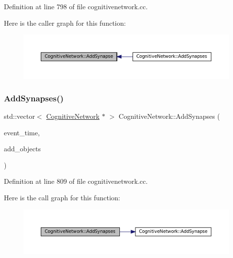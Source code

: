 Definition at line 798 of file cognitivenetwork.\+cc.

Here is the caller graph for this function\+:\nopagebreak
\begin{figure}[H]
\begin{center}
\leavevmode
\includegraphics[width=350pt]{class_cognitive_network_a4bfdcd2affdfe2adb2da68dba60dff0e_icgraph}
\end{center}
\end{figure}
\mbox{\label{class_cognitive_network_a09d9e01cbd8596af7fac626ce2753643}} 
\subsubsection{\texorpdfstring{Add\+Synapses()}{AddSynapses()}}
{\footnotesize\ttfamily std\+::vector$<$ \mbox{\hyperlink{class_cognitive_network}{Cognitive\+Network}} $\ast$ $>$ Cognitive\+Network\+::\+Add\+Synapses (\begin{DoxyParamCaption}\item[{std\+::chrono\+::time\+\_\+point$<$ \mbox{\hyperlink{universe_8h_a0ef8d951d1ca5ab3cfaf7ab4c7a6fd80}{Clock}} $>$}]{event\+\_\+time,  }\item[{std\+::vector$<$ \mbox{\hyperlink{class_cognitive_network}{Cognitive\+Network}} $\ast$$>$}]{add\+\_\+objects }\end{DoxyParamCaption})}



Definition at line 809 of file cognitivenetwork.\+cc.

Here is the call graph for this function\+:\nopagebreak
\begin{figure}[H]
\begin{center}
\leavevmode
\includegraphics[width=350pt]{class_cognitive_network_a09d9e01cbd8596af7fac626ce2753643_cgraph}
\end{center}
\end{figure}
\mbox{\label{class_cognitive_network_ae590ecb77db0a876425b9b74bcfe2bce}} 
